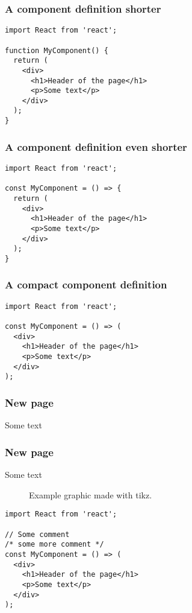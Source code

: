 \documentclass{beamer}
\begin{document}
\begin{frame}[fragile]
  \frametitle{A component definition shorter}
   \begin{verbatim}
import React from 'react';
   
function MyComponent() {
  return (
    <div>
      <h1>Header of the page</h1>
      <p>Some text</p>
    </div>
  );
}
   \end{verbatim}
\end{frame}


\begin{frame}[fragile]
  \frametitle{A component definition even shorter}
   \begin{verbatim}
import React from 'react';
   
const MyComponent = () => {
  return (
    <div>
      <h1>Header of the page</h1>
      <p>Some text</p>
    </div>
  );
}
   \end{verbatim}
\end{frame}


\begin{frame}[fragile]
  \frametitle{A compact component definition}
   \begin{verbatim}
import React from 'react';
   
const MyComponent = () => (
  <div>
    <h1>Header of the page</h1>
    <p>Some text</p>
  </div>
);
   \end{verbatim}
\end{frame}


\begin{frame}
  \frametitle{New page}
  Some text
\end{frame}

\begin{frame}
  \frametitle{New page}
  Some text
\end{frame}

\begin{frame}
\begin{figure}[h!]
  \begin{center}
    \caption{Example graphic made with tikz.}
  \end{center}
\end{figure}
\end{frame}


\begin{frame}[fragile]
\begin{lstlisting}
import React from 'react';

// Some comment
/* some more comment */   
const MyComponent = () => (
  <div>
    <h1>Header of the page</h1>
    <p>Some text</p>
  </div>
);
\end{lstlisting}
\end{frame}
\end{document}

